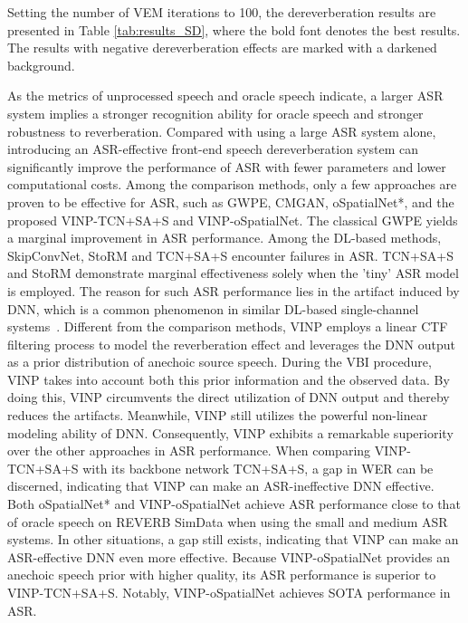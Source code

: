 Setting the number of VEM iterations to 100, the dereverberation results are presented in Table \ref{tab:results_SD}, where the bold font denotes the best results.
The results with negative dereverberation effects are marked with a darkened background.

As the metrics of unprocessed speech and oracle speech indicate, a larger ASR system implies a stronger recognition ability for oracle speech and stronger robustness to reverberation.
Compared with using a large ASR system alone, introducing an ASR-effective front-end speech dereverberation system can significantly improve the performance of ASR with fewer parameters and lower computational costs.
Among the comparison methods, only a few approaches are proven to be effective for ASR, such as GWPE, CMGAN, oSpatialNet*, and the proposed VINP-TCN+SA+S and VINP-oSpatialNet.
The classical GWPE yields a marginal improvement in ASR performance.
Among the DL-based methods, SkipConvNet, StoRM and TCN+SA+S encounter failures in ASR.
TCN+SA+S and StoRM demonstrate marginal effectiveness solely when the 'tiny' ASR model is employed.
The reason for such ASR performance lies in the artifact induced by DNN, which is a common phenomenon in similar DL-based single-channel systems~\cite{iwamoto22_interspeech,iwamoto2024does}.
Different from the comparison methods, VINP employs a linear CTF filtering process to model the reverberation effect and leverages the DNN output as a prior distribution of anechoic source speech.
During the VBI procedure, VINP takes into account both this prior information and the observed data.
By doing this, VINP circumvents the direct utilization of DNN output and thereby reduces the artifacts.
Meanwhile, VINP still utilizes the powerful non-linear modeling ability of DNN.
Consequently, VINP exhibits a remarkable superiority over the other approaches in ASR performance.
When comparing VINP-TCN+SA+S with its backbone network TCN+SA+S, a gap in WER can be discerned, indicating that VINP can make an ASR-ineffective DNN effective. 
Both oSpatialNet* and VINP-oSpatialNet achieve ASR performance close to that of oracle speech on REVERB SimData when using the small and medium ASR systems.
In other situations, a gap still exists, indicating that VINP can make an ASR-effective DNN even more effective.
Because VINP-oSpatialNet provides an anechoic speech prior with higher quality, its ASR performance is superior to VINP-TCN+SA+S.
Notably, VINP-oSpatialNet achieves SOTA performance in ASR.



